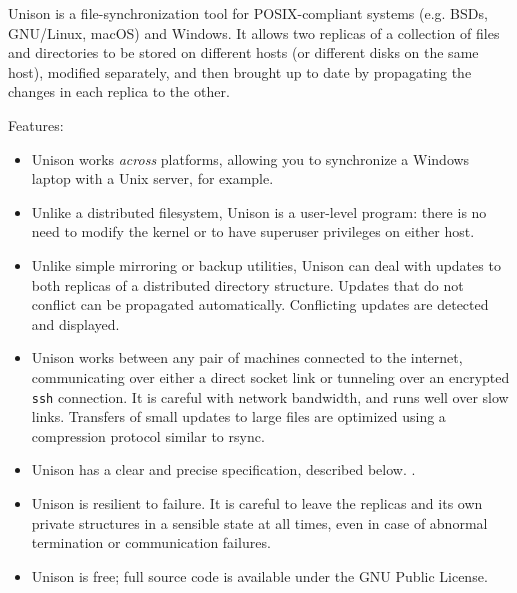 Unison is a file-synchronization tool for POSIX-compliant systems
(e.g. BSDs, GNU/Linux, macOS) and Windows.  It allows
two replicas of a collection of files and directories to be stored on
different hosts (or different disks on the same host), modified
separately, and then brought up to date by propagating the changes in
each replica to the other.

Features:
\begin{itemize}
\item Unison works {\em across} platforms, allowing you to synchronize a
  Windows laptop with a Unix server, for example.
\item Unlike a distributed filesystem, Unison is a user-level program:
  there is no need to modify the kernel or to have
  superuser privileges on either host.
\item Unlike simple mirroring or backup utilities, Unison can deal
  with updates to both replicas of a distributed directory structure.
  Updates that do not conflict can be propagated automatically.
  Conflicting updates are detected and displayed.
\item Unison works between any pair of machines connected to the
  internet, communicating over either a direct socket link or
  tunneling over an encrypted {\tt ssh} connection.
  It is careful with network bandwidth, and runs well over slow links.
  Transfers of small updates to large files are
  optimized using a compression protocol similar to rsync.
\item Unison has a clear and precise specification\iffull, described
below. \else. \fi
  \item Unison is resilient to failure.  It is careful to leave the
  replicas and its own private structures in a sensible state at all
  times, even in case of abnormal termination or communication
  failures.
\item Unison is free; full source code is available under the GNU
Public License.
\end{itemize}
